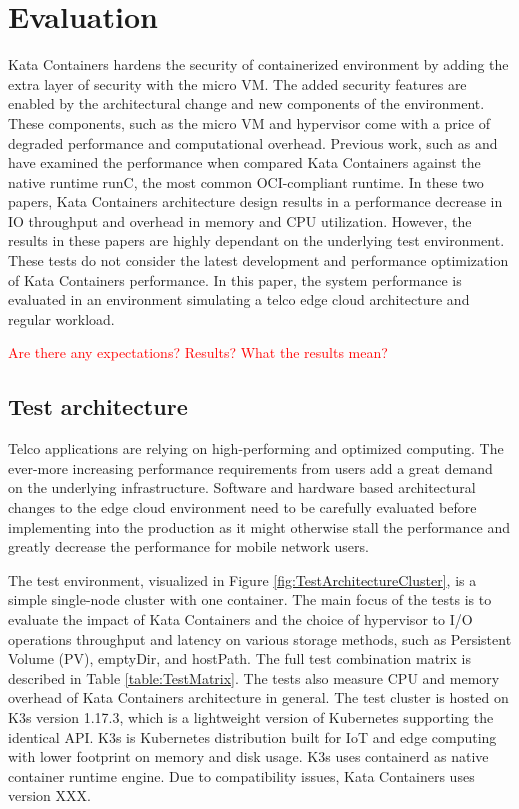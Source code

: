 \chapter{Evaluation}
\label{chapter:evaluation}

Kata Containers hardens the security of containerized environment by adding the extra layer of security with the micro VM. The added security features are enabled by the architectural change and new components of the environment. These components, such as the micro VM and hypervisor come with a price of degraded performance and computational overhead. Previous work, such as \cite{EverartsdeVelp2020} and \cite{Kumar2020} have examined the performance when compared Kata Containers against the native runtime runC, the most common OCI-compliant runtime. In these two papers, Kata Containers architecture design results in a performance decrease in IO throughput and overhead in memory and CPU utilization. However, the results in these papers are highly dependant on the underlying test environment. These tests do not consider the latest development and performance optimization of Kata Containers performance. In this paper, the system performance is evaluated in an environment simulating a telco edge cloud architecture and regular workload.

\textcolor{red}{Are there any expectations?}
\textcolor{red}{Results?}
\textcolor{red}{What the results mean?}

\section{Test architecture}
\label{section:test_architecture}

Telco applications are relying on high-performing and optimized computing. The ever-more increasing performance requirements from users add a great demand on the underlying infrastructure. Software and hardware based architectural changes to the edge cloud environment need to be carefully evaluated before implementing into the production as it might otherwise stall the performance and greatly decrease the performance for mobile network users.

The test environment, visualized in Figure \ref{fig:TestArchitectureCluster}, is a simple single-node cluster with one container. The main focus of the tests is to evaluate the impact of Kata Containers and the choice of hypervisor to I/O operations throughput and latency on various storage methods, such as Persistent Volume (PV), emptyDir, and hostPath. The full test combination matrix is described in Table \ref{table:TestMatrix}. The tests also measure CPU and memory overhead of Kata Containers architecture in general. The test cluster is hosted on K3s\cite{K3s} version 1.17.3, which is a lightweight version of Kubernetes supporting the identical API. K3s is Kubernetes distribution built for IoT and edge computing with lower footprint on memory and disk usage. K3s uses containerd as native container runtime engine. Due to compatibility issues, Kata Containers uses version XXX.

